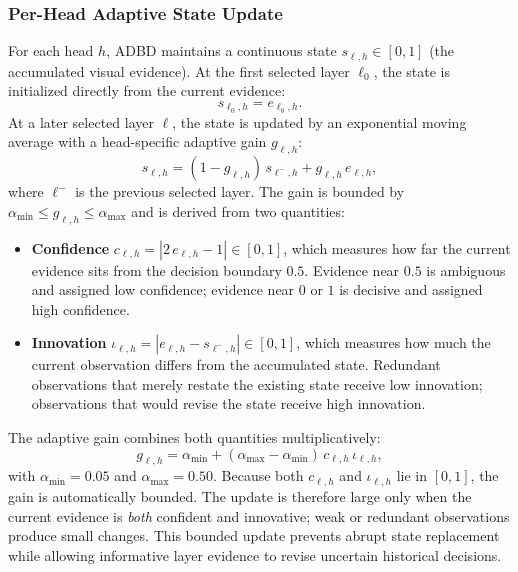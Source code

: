 \subsubsection{Per-Head Adaptive State Update}

For each head $h$, ADBD maintains a continuous state $s_{\ell,h} \in [0,1]$ (the accumulated visual evidence). At the first selected layer $\ell_0$, the state is initialized directly from the current evidence:
\begin{equation}
s_{\ell_0,h} = e_{\ell_0,h}.
\end{equation}
At a later selected layer $\ell$, the state is updated by an exponential moving average with a head-specific adaptive gain $g_{\ell,h}$:
\begin{equation}
s_{\ell,h} = (1 - g_{\ell,h})\, s_{\ell^{-},h} + g_{\ell,h}\, e_{\ell,h},
\end{equation}
where $\ell^{-}$ is the previous selected layer. The gain is bounded by $\alpha_{\min} \leq g_{\ell,h} \leq \alpha_{\max}$ and is derived from two quantities:
\begin{itemize}
    \item \textbf{Confidence} $c_{\ell,h} = |2\,e_{\ell,h} - 1| \in [0,1]$, which measures how far the current evidence sits from the decision boundary $0.5$. Evidence near $0.5$ is ambiguous and assigned low confidence; evidence near $0$ or $1$ is decisive and assigned high confidence.
    \item \textbf{Innovation} $\iota_{\ell,h} = |e_{\ell,h} - s_{\ell^{-},h}| \in [0,1]$, which measures how much the current observation differs from the accumulated state. Redundant observations that merely restate the existing state receive low innovation; observations that would revise the state receive high innovation.
\end{itemize}
The adaptive gain combines both quantities multiplicatively:
\begin{equation}
g_{\ell,h} = \alpha_{\min} + (\alpha_{\max} - \alpha_{\min})\, c_{\ell,h}\, \iota_{\ell,h},
\end{equation}
with $\alpha_{\min}=0.05$ and $\alpha_{\max}=0.50$. Because both $c_{\ell,h}$ and $\iota_{\ell,h}$ lie in $[0,1]$, the gain is automatically bounded. The update is therefore large only when the current evidence is \emph{both} confident and innovative; weak or redundant observations produce small changes. This bounded update prevents abrupt state replacement while allowing informative layer evidence to revise uncertain historical decisions.

